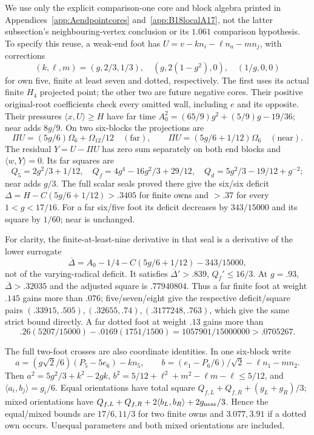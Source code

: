 \documentclass[11pt]{article}
\theoremstyle{definition}
\theoremstyle{remark}
\newcommand{\ip}[2]{\langle #1,#2\rangle}
\begin{document}
We use only the explicit comparison-one core and block algebra printed
in Appendices~\ref{app:Aendpointcores} and~\ref{app:B18localA17},
not the latter subsection's neighbouring-vertex conclusion or its
\(1.061\) comparison hypothesis. To specify this reuse, a weak-end
foot has \(U=v-k n_i-\ell n_a-m n_j\), with corrections
\[
 (k,\ell,m)=(g,2/3,1/3),\quad
 (g,2(1-g^2),0),\quad(1/g,0,0)
\]
for own five, finite at least seven and dotted, respectively.
The first uses its actual finite \(H_4\) projected point; the other
two are future negative cores. Their positive original-root
coefficients check every omitted wall, including \(e\) and its
opposite. Their pressures \(\ip xU\ge H\) have far time
\(A_0^2=(65/9)g^2+(5/9)g-19/36\); near adds \(8g/9\).
On two six-blocks the projections are
\[
 \Pi U=(5g/6)\Omega_6+\Omega_{12}/12\quad(\text{far}),\qquad
 \Pi U=(5g/6+1/12)\Omega_6\quad(\text{near}).
\]
The residual \(Y=U-\Pi U\) has zero sum separately on both end
blocks and \(\ip wY=0\). Its far squares are
\[
 Q_5=2g^2/3+1/12,\quad
 Q_f=4g^4-16g^2/3+29/12,\quad
 Q_d=5g^2/3-19/12+g^{-2};
\]
near adds \(g/3\). The full scalar seals proved there give the
six/six deficit \(\Delta=H-C(5g/6+1/12)>.3405\) for finite
owns and \(>.37\) for every \(1<g<17/16\).
For a far six/five foot its deficit decreases by \(343/15000\)
and its square by \(1/60\); near is unchanged.

For clarity, the finite-at-least-nine derivative in that seal is a
derivative of the lower surrogate
\[
 \overline\Delta=A_0-1/4-C(5g/6+1/12)-343/15000,
\]
not of the varying-radical deficit. It satisfies
\(\overline\Delta'>.839\), \(Q_f'\le16/3\).
At \(g=.93\), \(\overline\Delta>.32035\) and the adjusted
square is \(.77940804\). Thus a far finite foot at weight
\(.145\) gains more than \(.076\); five/seven/eight give
the respective deficit/square pairs
\((.33915,.505),(.32655,.74),(.3177248,.763)\), which give
the same strict bound directly. A far dotted foot at weight \(.13\)
gains more than
\[
 .26(5207/15000)-.0169(1751/1500)
           =1057901/15000000>.0705267.
\]

The full two-foot crosses are also coordinate identities. In one
six-block write
\[
 a=(g\sqrt2/6)(P_5-5e_6)-k n_5,\qquad
 b=(e_1-P_6/6)/\sqrt2-\ell n_1-m n_2.
\]
Then \(a^2=5g^2/3+k^2-2gk\),
\(b^2=5/12+\ell^2+m^2-\ell m-\ell\le5/12\), and
\(\ip{a_i}{b_j}=g_i/6\). Equal orientations have total square
\(Q_{f,L}+Q_{f,R}+(g_L+g_R)/3\); mixed orientations have
\(Q_{f,L}+Q_{f,R}+2\ip{b_L}{b_R}+2g_{\rm near}/3\).
Hence the equal/mixed bounds are \(17/6,11/3\) for two finite
owns and \(3.077,3.91\) if a dotted own occurs. Unequal
parameters and both mixed orientations are included.
\end{document}
